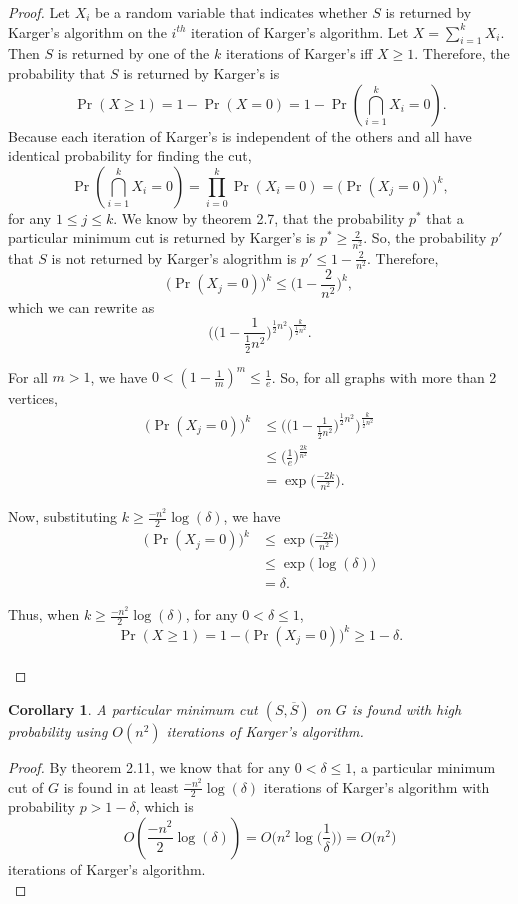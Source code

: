 \documentclass[psamsfonts, 10pt]{amsart}
\newtheorem{cor}[thm]{Corollary}
\theoremstyle{definition}
\theoremstyle{remark}
\numberwithin{equation}{section}
\begin{document}
\begin{proof}
Let $X_i$ be a random variable that indicates whether $S$ is returned by Karger's algorithm on the $i^{th}$ iteration of Karger's algorithm. Let $X = \sum_{i = 1}^{k} X_i$. Then $S$ is returned by one of the $k$ iterations of Karger's iff $X \geq 1$. Therefore, the probability that $S$ is returned by Karger's is
\[
\Pr(X \geq 1)  = 1 - \Pr(X  = 0) = 1 - \Pr\left(\bigcap_{i=1}^k X_i = 0 \right).
\]
Because each iteration of Karger's is independent of the others and all have identical probability for finding the cut,
\[
\Pr\left(\bigcap_{i=1}^k X_i = 0 \right) = \prod_{i  = 0}^k \Pr(X_i = 0) = \Big(\Pr(X_j = 0)\Big)^k,
\]
for any $1 \leq j \leq k$. We know by theorem 2.7, that the probability $p^*$ that a particular minimum cut is returned by Karger's is $p^* \geq \frac{2}{n^2}$. So, the probability $p'$ that $S$ is not returned by Karger's alogrithm is $p' \leq 1- \frac{2}{n^2}$. Therefore,
\[
\Big(\Pr(X_j = 0)\Big)^k \leq \Big(1- \frac{2}{n^2}\Big)^k,
\]
which we can rewrite as
\[
\Bigg( \bigg( 1 - \frac{1}{\frac{1}{2}n^2}\bigg)^{\frac{1}{2}n^2}\Bigg)^\frac{k}{\frac{1}{2}n^2}.
\]

For all  $m > 1$,  we have $0 < (1 - \frac{1}{m})^m \leq \frac{1}{e}$. So, for all graphs with more than 2 vertices,
\begin{equation}\begin{aligned}
\Big(\Pr(X_j = 0)\Big)^k &\leq \Bigg( \bigg( 1 - \frac{1}{\frac{1}{2}n^2}\bigg)^{\frac{1}{2}n^2}\Bigg)^\frac{k}{\frac{1}{2}n^2}\\
& \leq \Big( \frac{1}{e}\Big)^{\frac{2k}{n^2}}\\
&= \exp\bigg(\frac{-2k}{n^2}\bigg).
\end{aligned}
\end{equation}

Now, substituting $k \geq \frac{-n^2}{2}\log(\delta)$, we have
\[\begin{aligned}
\Big(\Pr(X_j = 0)\Big)^k &\leq  \exp\bigg(\frac{-2k}{n^2}\bigg)\\
&\leq \exp\Big(\log(\delta)\Big)\\
& = \delta.
\end{aligned}
\]

Thus, when $k \geq \frac{-n^2}{2}\log(\delta)$, for any $0 < \delta \leq 1$,
\[
\Pr(X \geq 1)  = 1 - \Big(\Pr(X_j = 0)\Big)^k \geq 1 - \delta.
\]
\\
\end{proof}


\begin{cor}
A particular minimum cut $(S, \overline{S})$ on $G$ is found with high probability using $O(n^2)$ iterations of Karger's algorithm.
\end{cor}
\begin{proof}
By theorem 2.11, we know that for any $0 < \delta \leq 1$, a particular minimum cut of $G$ is found in at least $\frac{-n^2}{2}\log(\delta)$ iterations of Karger's algorithm with probability $p > 1 - \delta$, which is
\[
O\left(\frac{-n^2}{2}\log(\delta)\right) = O\Bigg(n^2\log\bigg(\frac{1}{\delta}\bigg)\Bigg) = O\Big(n^2\Big)
\]
iterations of Karger's algorithm. 
\\
\end{proof}
\end{document}
